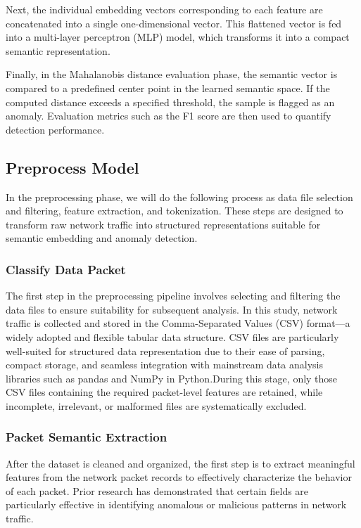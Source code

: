 \begin{ZhChapter}
Next, the individual embedding vectors corresponding to each feature are concatenated into a single one-dimensional vector. This flattened vector is fed into a multi-layer perceptron (MLP) model, which transforms it into a compact semantic representation.

Finally, in the Mahalanobis distance evaluation phase, the semantic vector is compared to a predefined center point in the learned semantic space. If the computed distance exceeds a specified threshold, the sample is flagged as an anomaly. Evaluation metrics such as the F1 score are then used to quantify detection performance.

\subsection{Preprocess Model}
In the preprocessing phase, we will do the following process as data file selection and filtering, feature extraction, and tokenization. These steps are designed to transform raw network traffic into structured representations suitable for semantic embedding and anomaly detection.

\subsubsection{Classify Data Packet}

The first step in the preprocessing pipeline involves selecting and filtering the data files to ensure suitability for subsequent analysis. In this study, network traffic is collected and stored in the Comma-Separated Values (CSV) format—a widely adopted and flexible tabular data structure. CSV files are particularly well-suited for structured data representation due to their ease of parsing, compact storage, and seamless integration with mainstream data analysis libraries such as pandas and NumPy in Python.During this stage, only those CSV files containing the required packet-level features are retained, while incomplete, irrelevant, or malformed files are systematically excluded.

\subsubsection{Packet Semantic Extraction}

After the dataset is cleaned and organized, the first step is to extract meaningful features from the network packet records to effectively characterize the behavior of each packet. Prior research has demonstrated that certain fields are particularly effective in identifying anomalous or malicious patterns in network traffic.


\end{ZhChapter}
